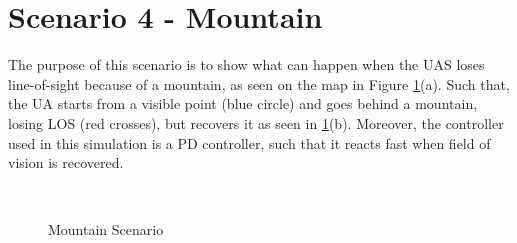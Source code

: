 \newpage
\section{Scenario 4 - Mountain}\label{sec:scenario4}
The purpose of this scenario is to show what can happen when the UAS loses line-of-sight because of a mountain, as seen on the map in Figure \ref{fig:s4_map}(a). Such that, the UA starts from a visible point (blue circle) and goes behind a mountain, losing LOS (red crosses), but recovers it as seen in \ref{fig:s4_map}(b). Moreover, the controller used in this simulation is a PD controller, such that it reacts fast when field of vision is recovered.

\begin{figure}[H]
	\centering
	\\
	\caption{Mountain Scenario}
	\label{fig:s4_map}
\end{figure}

